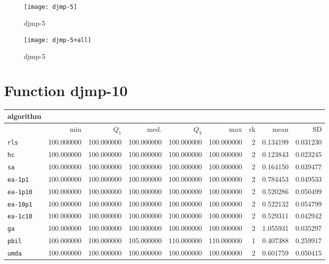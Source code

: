 \begin{center}
\begin{figure}[h]
\centering
\texttt{[image: djmp-5]}
\caption{djmp-5}
\end{figure}
\end{center}

\begin{center}
\begin{figure}[h]
\centering
\texttt{[image: djmp-5+all]}
\caption{djmp-5}
\end{figure}
\end{center}

\newpage

\section{Function djmp-10}
\begin{center}
\begin{tabular}{@{}l*{5}{>{{}}N{3}{0}}>{{}}N{2}{0}N{1}{3}N{1}{3}@{}}
\toprule
{algorithm} &  &  \\
\midrule
& {min} & {$Q_1$} & {med.} & {$Q_3$} & {max} & {rk} & {mean} & {SD} \\
\midrule
\verb|rls| & {\color{blue}} 100.000000 & {\color{blue}} 100.000000 & 100.000000 & 100.000000 & 100.000000 & 2 & 0.134199 & 0.031230 \\
 \verb|hc| & {\color{blue}} 100.000000 & {\color{blue}} 100.000000 & 100.000000 & 100.000000 & 100.000000 & 2 & 0.123843 & 0.023245 \\
 \verb|sa| & {\color{blue}} 100.000000 & {\color{blue}} 100.000000 & 100.000000 & 100.000000 & 100.000000 & 2 & 0.164150 & 0.039477 \\
 \verb|ea-1p1| & {\color{blue}} 100.000000 & {\color{blue}} 100.000000 & 100.000000 & 100.000000 & 100.000000 & 2 & 0.784453 & 0.049533 \\
 \verb|ea-1p10| & {\color{blue}} 100.000000 & {\color{blue}} 100.000000 & 100.000000 & 100.000000 & 100.000000 & 2 & 0.520286 & 0.050499 \\
 \verb|ea-10p1| & {\color{blue}} 100.000000 & {\color{blue}} 100.000000 & 100.000000 & 100.000000 & 100.000000 & 2 & 0.522132 & 0.054799 \\
 \verb|ea-1c10| & {\color{blue}} 100.000000 & {\color{blue}} 100.000000 & 100.000000 & 100.000000 & 100.000000 & 2 & 0.529311 & 0.042942 \\
 \verb|ga| & {\color{blue}} 100.000000 & {\color{blue}} 100.000000 & 100.000000 & 100.000000 & 100.000000 & 2 & 1.055931 & 0.035297 \\
 \verb|pbil| & {\color{blue}} 100.000000 & {\color{blue}} 100.000000 & {\color{blue}} 105.000000 & {\color{blue}} 110.000000 & {\color{blue}} 110.000000 & 1 & 0.407388 & 0.259917 \\
 \verb|umda| & {\color{blue}} 100.000000 & {\color{blue}} 100.000000 & 100.000000 & 100.000000 & 100.000000 & 2 & 0.601759 & 0.050415 \\
 \bottomrule
\end{tabular}
\end{center}

